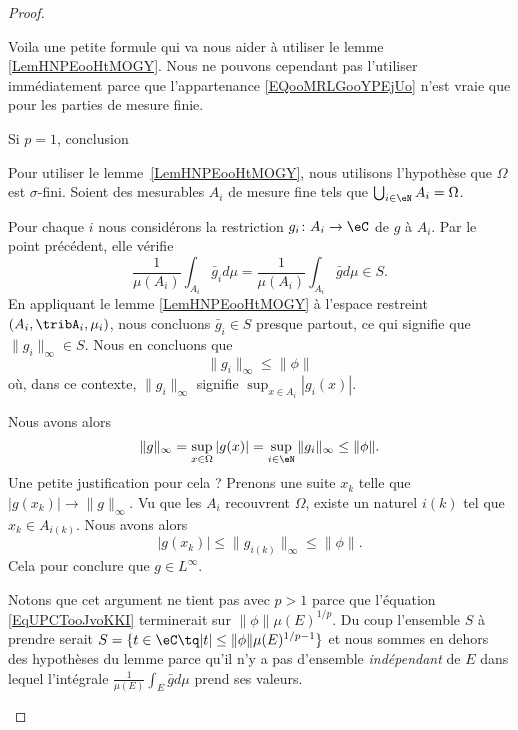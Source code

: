\begin{proof}
\begin{subproof}
            Voila une petite formule qui va nous aider à utiliser le lemme \ref{LemHNPEooHtMOGY}. Nous ne pouvons cependant pas l'utiliser immédiatement parce que l'appartenance \eqref{EQooMRLGooYPEjUo} n'est vraie que pour les parties de mesure finie.

        \item[Si \( p=1\), conclusion\cite{MonCerveau}]

            Pour utiliser le lemme~\ref{LemHNPEooHtMOGY}, nous utilisons l'hypothèse que \( \Omega\) est \( \sigma\)-fini. Soient des mesurables \( A_i\) de mesure fine tels que \( \bigcup_{i\in \eN}A_i=\Omega\).

            Pour chaque \( i\) nous considérons la restriction \( g_i\colon A_i\to \eC\) de \( g\) à \( A_i\). Par le point précédent, elle vérifie
            \begin{equation}
                \frac{1}{ \mu(A_i) }\int_{A_i}\bar g_id\mu=\frac{1}{ \mu(A_i) }\int_{A_i}\bar gd\mu\in S.
            \end{equation}
            En appliquant le lemme \ref{LemHNPEooHtMOGY} à l'espace restreint \( (A_i,\tribA_i,\mu_i)\), nous concluons \( \bar g_i\in S\) presque partout, ce qui signifie que \( \| g_i \|_{\infty}\in S\). Nous en concluons que
            \begin{equation}
                \| g_i \|_{\infty}\leq \| \phi \|
            \end{equation}
            où, dans ce contexte, \( \| g_i \|_{\infty}\) signifie \( \sup_{x\in A_i}| g_i(x) |\).
            
            Nous avons alors
            \begin{equation}
                \| g \|_{\infty}=\sup_{x\in \Omega}| g(x) |=\sup_{i\in \eN}\| g_i \|_{\infty}\leq \| \phi \|.
            \end{equation}
            Une petite justification pour cela ? Prenons une suite \( x_k\) telle que \( | g(x_k) |\to \| g \|_{\infty}\). Vu que les \( A_i\) recouvrent \( \Omega\), existe un naturel \( i(k)\) tel que \( x_k\in A_{i(k)}\). Nous avons alors
            \begin{equation}
                | g(x_k) |\leq \| g_{i(k)} \|_{\infty}\leq \| \phi \|.
            \end{equation}
            Cela pour conclure que \( g\in L^{\infty}\).

            Notons que cet argument ne tient pas avec \( p> 1\) parce que l'équation \eqref{EqUPCTooJvoKKI} terminerait sur \( \| \phi \|\mu(E)^{1/p}\). Du coup l'ensemble \( S\) à prendre serait \( S=\{ t\in \eC\tq | t |\leq \| \phi \|\mu(E)^{1/p-1} \}\) et nous sommes en dehors des hypothèses du lemme parce qu'il n'y a pas d'ensemble \emph{indépendant} de \( E\) dans lequel l'intégrale \( \frac{1}{ \mu(E) }\int_{E}\bar gd\mu\) prend ses valeurs.


\end{subproof}
\end{proof}
